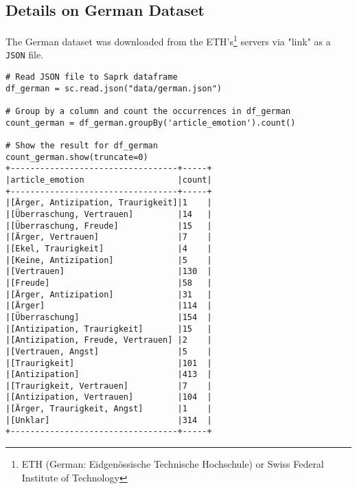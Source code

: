 \subsection{Details on German Dataset}
The German dataset was downloaded from the ETH's\footnote{ETH (German: Eidgenössische Technische Hochschule) or Swiss Federal Institute of Technology} servers via "link" as a \texttt{JSON} file.
\begin{verbatim}
# Read JSON file to Saprk dataframe
df_german = sc.read.json("data/german.json")

# Group by a column and count the occurrences in df_german
count_german = df_german.groupBy('article_emotion').count()

# Show the result for df_german
count_german.show(truncate=0)
+----------------------------------+-----+
|article_emotion                   |count|
+----------------------------------+-----+
|[Ärger, Antizipation, Traurigkeit]|1    |
|[Überraschung, Vertrauen]         |14   |
|[Überraschung, Freude]            |15   |
|[Ärger, Vertrauen]                |7    |
|[Ekel, Traurigkeit]               |4    |
|[Keine, Antizipation]             |5    |
|[Vertrauen]                       |130  |
|[Freude]                          |58   |
|[Ärger, Antizipation]             |31   |
|[Ärger]                           |114  |
|[Überraschung]                    |154  |
|[Antizipation, Traurigkeit]       |15   |
|[Antizipation, Freude, Vertrauen] |2    |
|[Vertrauen, Angst]                |5    |
|[Traurigkeit]                     |101  |
|[Antizipation]                    |413  |
|[Traurigkeit, Vertrauen]          |7    |
|[Antizipation, Vertrauen]         |104  |
|[Ärger, Traurigkeit, Angst]       |1    |
|[Unklar]                          |314  |
+----------------------------------+-----+

\end{verbatim}





\clearpage